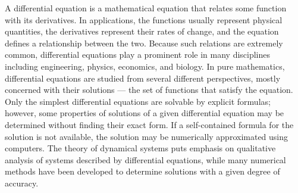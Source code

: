 A differential equation is a mathematical equation that relates some function with its derivatives. In applications, the functions usually represent physical quantities, the derivatives represent their rates of change, and the equation defines a relationship between the two. Because such relations are extremely common, differential equations play a prominent role in many disciplines including engineering, physics, economics, and biology.
In pure mathematics, differential equations are studied from several different perspectives, mostly concerned with their solutions — the set of functions that satisfy the equation. Only the simplest differential equations are solvable by explicit formulas; however, some properties of solutions of a given differential equation may be determined without finding their exact form.
If a self-contained formula for the solution is not available, the solution may be numerically approximated using computers. The theory of dynamical systems puts emphasis on qualitative analysis of systems described by differential equations, while many numerical methods have been developed to determine solutions with a given degree of accuracy.
